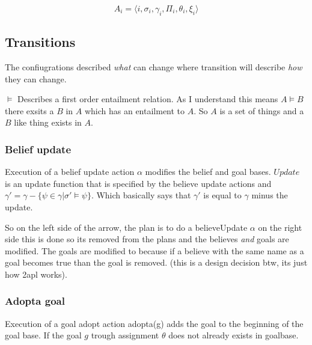 \documentclass{article}
\begin{document}
\[A_i = \langle i, \sigma_i, \gamma_i, \Pi_i, \theta_i, \xi_i \rangle \]

\subsection{Transitions}
The confiugrations described \emph{what} can change where transition
will describe \emph{how} they can change.

$\vDash$ Describes a first order entailment relation. As I understand
this means $A \vDash B$ there exsits a $B$ in $A$ which has an entailment
to $A$. So $A$ is a set of things and a $B$ like thing exists in $A$.
\subsubsection{Belief update}
Execution of a belief update action $\alpha$ modifies the belief and goal
bases. $Update$ is an update function that is specified by the believe
update actions and $\gamma'=\gamma - \{\psi \in \gamma | \sigma' \vDash \psi\}$.
Which basically says that $\gamma'$ is equal to $\gamma$ minus the update.

\begin{prooftree}

\end{prooftree}

So on the left side of the arrow, the plan is to do a believeUpdate $\alpha$
on the right side this is done so its removed from the plans and the believes
\emph{and} goals are modified. The goals are modified to because if a believe
with the same name as a goal becomes true than the goal is removed. (this is
a design decision btw, its just how 2apl works).

\subsubsection{Adopta goal}
Execution of a goal adopt action adopta(g) adds the goal to the beginning of
the goal base. If the goal $g$ trough assignment $\theta$ does not already
exists in goalbase.

\begin{prooftree}
\end{prooftree}
\end{document}
